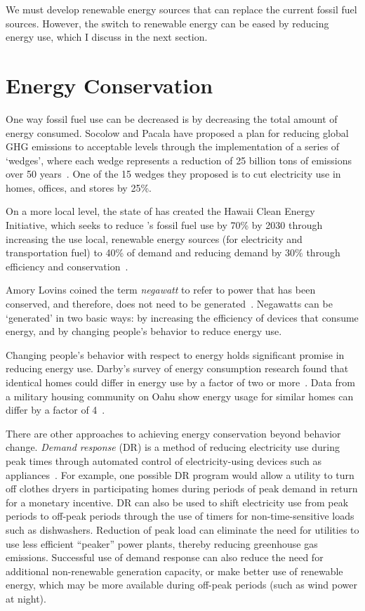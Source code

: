 We must develop renewable energy sources that can replace the current fossil fuel sources. However, the switch to renewable energy can be eased by reducing energy use, which I discuss in the next section.


\section{Energy Conservation}

One way fossil fuel use can be decreased is by decreasing the total amount of energy consumed. Socolow and Pacala have proposed a plan for reducing global GHG emissions to acceptable levels through the implementation of a series of `wedges', where each wedge represents a reduction of 25 billion tons of \COtwo emissions over 50 years~\cite{Socolow2008}. One of the 15 wedges they proposed is to cut electricity use in homes, offices, and stores by 25\%.

On a more local level, the state of \Hawaii has created the Hawaii Clean Energy Initiative, which seeks to reduce \Hawaii's fossil fuel use by 70\% by 2030 through increasing the use local, renewable energy sources (for electricity and transportation fuel) to 40\% of demand and reducing demand by 30\% through efficiency and conservation~\cite{HCEI-website}.

Amory Lovins coined the term \emph{negawatt} to refer to power that has been conserved, and therefore, does not need to be generated~\cite{Kolbert2007Mr-Green}. Negawatts can be `generated' in two basic ways: by increasing the efficiency of devices that consume energy, and by changing people's behavior to reduce energy use.

Changing people's behavior with respect to energy holds significant promise in reducing energy use. Darby's survey of energy consumption research found that identical homes could differ in energy use by a factor of two or more~\cite{darby-review-2006}. Data from a military housing community on Oahu show energy usage for similar homes can differ by a factor of 4~\cite{Norton2010ZeroEnergyHomes}.

There are other approaches to achieving energy conservation beyond behavior change. \emph{Demand response} (DR) is a method of reducing electricity use during peak times through automated control of electricity-using devices such as appliances~\cite{Davito2010,Cappers2010}. For example, one possible DR program would allow a utility to turn off clothes dryers in participating homes during periods of peak demand in return for a monetary incentive. DR can also be used to shift electricity use from peak periods to off-peak periods through the use of timers for non-time-sensitive loads such as dishwashers. Reduction of peak load can eliminate the need for utilities to use less efficient ``peaker'' power plants, thereby reducing greenhouse gas emissions. Successful use of demand response can also reduce the need for additional non-renewable generation capacity, or make better use of renewable energy, which may be more available during off-peak periods (such as wind power at night).

